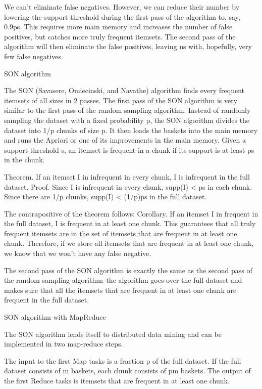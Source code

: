 We can’t eliminate false negatives. However, we can reduce their number by lowering the support threshold during the first pass of the algorithm to, say, 0.9ps. This requires more main memory and increases the number of false positives, but catches more truly frequent itemsets. The second pass of the algorithm will then eliminate the false positives, leaving us with, hopefully, very few false negatives.

SON algorithm

The SON (Savasere, Omiecinski, and Navathe) algorithm finds every frequent itemsets of all sizes in 2 passes. The first pass of the SON algorithm is very similar to the first pass of the random sampling algorithm. Instead of randomly sampling the dataset with a fixed probability p, the SON algorithm divides the dataset into 1/p chunks of size p. It then loads the baskets into the main memory and runs the Apriori or one of its improvements in the main memory. Given a support threshold s, an itemset is frequent in a chunk if its support is at least ps in the chunk.

Theorem. If an itemset I in infrequent in every chunk, I is infrequent in the full dataset.
Proof. Since I is infrequent in every chunk, \mbox{supp}(I) < ps in each chunk. Since there are 1/p chunks, \mbox{supp}(I) < (1/p)ps in the full dataset. \square

The contrapositive of the theorem follows:
Corollary. If an itemset I in frequent in the full dataset, I is frequent in at least one chunk.
This guarantees that all truly frequent itemsets are in the set of itemsets that are frequent in at least one chunk. Therefore, if we store all itemsets that are frequent in at least one chunk, we know that we won’t have any false negative.

The second pass of the SON algorithm is exactly the same as the second pass of the random sampling algorithm: the algorithm goes over the full dataset and makes sure that all the itemsets that are frequent in at least one chunk are frequent in the full dataset.

SON algorithm with MapReduce

The SON algorithm lends itself to distributed data mining and can be implemented in two map-reduce steps.

The input to the first Map tasks is a fraction p of the full dataset. If the full dataset consists of m baskets, each chunk consists of pm baskets. The output of the first Reduce tasks is itemsets that are frequent in at least one chunk.

